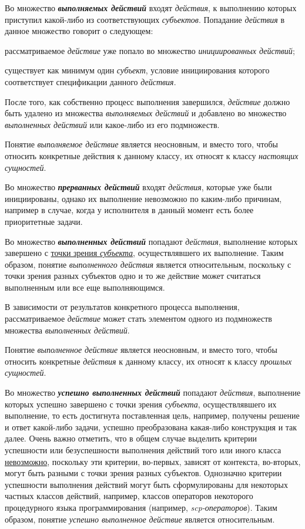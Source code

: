 Во множество \textbf{\textit{выполняемых действий}} входят \textit{действия}, к выполнению которых приступил какой-либо из соответствующих \textit{субъектов}.
Попадание \textit{действия} в данное множество говорит о следующем:
\begin{textitemize}
	\item рассматриваемое \textit{действие} уже попало во множество \textit{инициированных действий};
	\item существует как минимум один \textit{субъект}, условие инициирования которого соответствует спецификации данного \textit{действия}.
\end{textitemize}

После того, как собственно процесс выполнения завершился, \textit{действие} должно быть удалено из множества \textit{выполняемых действий} и добавлено во множество \textit{выполненных действий} или какое-либо из его подмножеств.

Понятие \textit{выполняемое действие} является неосновным, и вместо того, чтобы относить конкретные действия к данному классу, их относят к классу \textit{настоящих сущностей}.

Во множество \textbf{\textit{прерванных действий}} входят \textit{действия}, которые уже были инициированы, однако их выполнение невозможно по каким-либо причинам, например в случае, когда у исполнителя в данный момент есть более приоритетные задачи.

Во множество \textbf{\textit{выполненных действий}} попадают \textit{действия}, выполнение которых завершено с \uline{точки зрения \textit{субъекта}}, осуществлявшего их выполнение. Таким образом, понятие \textit{выполненного действия} является относительным, поскольку с точки зрения разных субъектов одно и то же действие может считаться выполненным или все еще выполняющимся.

В зависимости от результатов конкретного процесса выполнения, рассматриваемое \textit{действие} может стать элементом одного из подмножеств множества \textit{выполненных действий}.

Понятие \textit{выполненное действие} является неосновным, и вместо того, чтобы относить конкретные \textit{действия} к данному классу, их относят к классу \textit{прошлых сущностей}.

Во множество \textbf{\textit{успешно выполненных действий}} попадают \textit{действия}, выполнение которых успешно завершено с точки зрения \textit{субъекта}, осуществлявшего их выполнение, то есть достигнута поставленная цель, например, получены решение и ответ какой-либо задачи, успешно преобразована какая-либо конструкция и так далее. Очень важно отметить, что в общем случае выделить критерии успешности или безуспешности выполнения действий того или иного класса \uline{невозможно}, поскольку эти критерии, во-первых, зависят от контекста, во-вторых, могут быть разными с точки зрения разных субъектов. Однозначно критерии успешности выполнения действий могут быть сформулированы для некоторых частных классов действий, например, классов операторов некоторого процедурного языка программирования (например, \textit{scp-операторов}). Таким образом, понятие \textit{успешно выполненное действие} является относительным.

